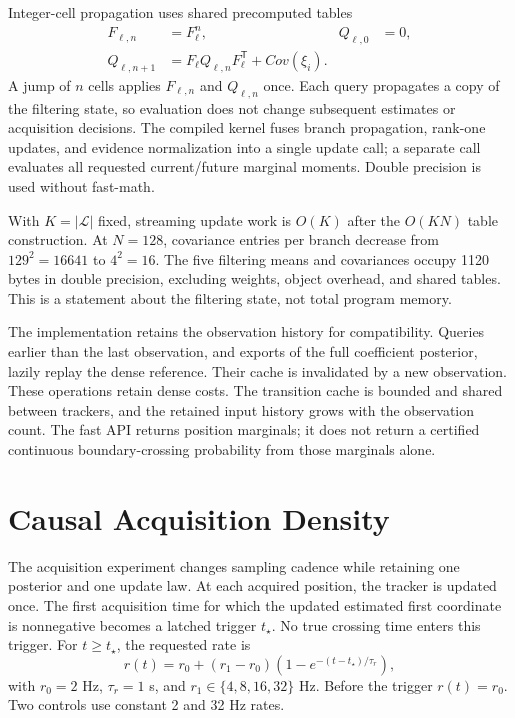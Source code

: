 \documentclass[journal]{IEEEtran}
\newcommand{\trans}{\mathsf{T}}
\begin{document}
Integer-cell propagation uses shared precomputed tables
\begin{align}
 F_{\ell,n}&=F_\ell^n,&Q_{\ell,0}&=0,\nonumber\\
 Q_{\ell,n+1}&=F_\ell Q_{\ell,n}F_\ell^\trans+Cov(\xi_i).
 \label{eq:jump}
\end{align}
A jump of $n$ cells applies $F_{\ell,n}$ and $Q_{\ell,n}$ once. Each
query propagates a copy of the filtering state, so evaluation does not
change subsequent estimates or acquisition decisions. The compiled
kernel fuses branch propagation, rank-one updates, and evidence
normalization into a single update call; a separate call evaluates all
requested current/future marginal moments. Double precision is used
without fast-math.

With $K=|\mathcal L|$ fixed, streaming update work is $O(K)$ after the
$O(KN)$ table construction. At $N=128$, covariance entries per branch
decrease from $129^2=16641$ to $4^2=16$. The five filtering means and
covariances occupy 1120 bytes in double precision, excluding weights,
object overhead, and shared tables. This is a statement about the
filtering state, not total program memory.

The implementation retains the observation history for compatibility.
Queries earlier than the last observation, and exports of the full
coefficient posterior, lazily replay the dense reference. Their cache
is invalidated by a new observation. These operations retain dense costs.
The transition cache is bounded and shared between trackers, and the
retained input history grows with the observation count. The fast API
returns position marginals; it does not return a certified continuous
boundary-crossing probability from those marginals alone.

\section{Causal Acquisition Density}
\label{sec:acquisition}

The acquisition experiment changes sampling cadence while retaining one
posterior and one update law. At each acquired position, the tracker is
updated once. The first acquisition time for which the updated estimated
first coordinate is nonnegative becomes a latched trigger $t_\star$.
No true crossing time enters this trigger. For $t\geq t_\star$, the
requested rate is
\begin{equation}
 r(t)=r_0+(r_1-r_0)\left(1-e^{-(t-t_\star)/\tau_r}\right),
 \label{eq:rate}
\end{equation}
with $r_0=2$ Hz, $\tau_r=1$ s, and
$r_1\in\{4,8,16,32\}$ Hz. Before the trigger $r(t)=r_0$.
Two controls use constant 2 and 32 Hz rates.
\end{document}
